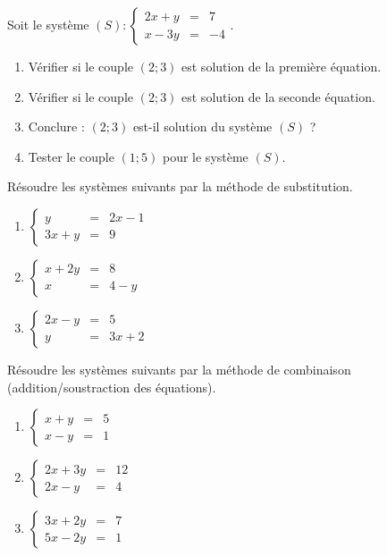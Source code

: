 \documentclass[11pt]{article}
\begin{document}
\begin{exercice}
Soit le système $(S) : \left\{ \begin{array}{rcl} 2x + y &=& 7 \\ x - 3y &=& -4 \end{array} \right.$.
\begin{enumerate}
    \item Vérifier si le couple $(2 ; 3)$ est solution de la première équation.
    \item Vérifier si le couple $(2 ; 3)$ est solution de la seconde équation.
    \item Conclure : $(2 ; 3)$ est-il solution du système $(S)$ ?
    \item Tester le couple $(1 ; 5)$ pour le système $(S)$.
\end{enumerate}
\end{exercice}

\begin{exercice}
Résoudre les systèmes suivants par la méthode de substitution.
\begin{enumerate}
    \item $\left\{ \begin{array}{rcl} y &=& 2x - 1 \\ 3x + y &=& 9 \end{array} \right.$
    \item $\left\{ \begin{array}{rcl} x + 2y &=& 8 \\ x &=& 4 - y \end{array} \right.$
    \item $\left\{ \begin{array}{rcl} 2x - y &=& 5 \\ y &=& 3x + 2 \end{array} \right.$
\end{enumerate}
\end{exercice}

\begin{exercice}
Résoudre les systèmes suivants par la méthode de combinaison (addition/soustraction des équations).
\begin{enumerate}
    \item $\left\{ \begin{array}{rcl} x + y &=& 5 \\ x - y &=& 1 \end{array} \right.$
    \item $\left\{ \begin{array}{rcl} 2x + 3y &=& 12 \\ 2x - y &=& 4 \end{array} \right.$
    \item $\left\{ \begin{array}{rcl} 3x + 2y &=& 7 \\ 5x - 2y &=& 1 \end{array} \right.$
\end{enumerate}
\end{exercice}
\end{document}
